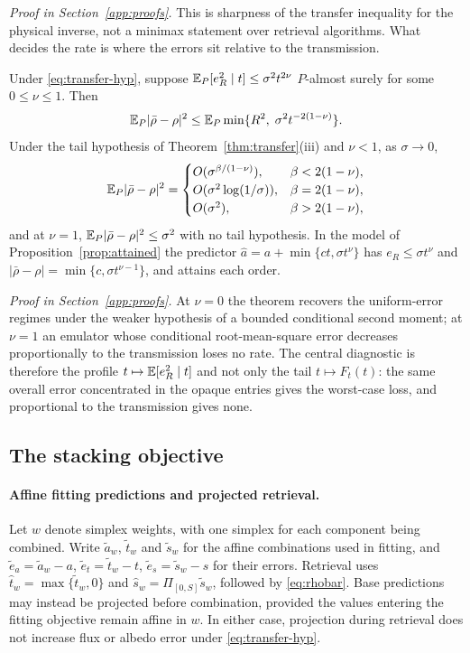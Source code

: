 \noindent\emph{Proof in Section~\ref{app:proofs}.}
This is sharpness of the transfer inequality for the physical inverse, not a minimax statement over retrieval
algorithms. What decides the rate is where the errors sit relative to the transmission.

\begin{theorem}\label{thm:profile}
Under \eqref{eq:transfer-hyp}, suppose $\mathbb{E}_P[e_R^2\mid t]\le\sigma^2t^{2\nu}$ $P$-almost surely for some $0\le\nu\le1$. Then
\[
\mathbb{E}_P|\bar\rho-\rho|^2\le\mathbb{E}_P\min\{R^2,\;\sigma^2t^{-2(1-\nu)}\} .
\]
Under the tail hypothesis of Theorem~\ref{thm:transfer}(iii) and $\nu<1$, as $\sigma\to0$,
\[
\mathbb{E}_P|\bar\rho-\rho|^2=
\begin{cases}
O(\sigma^{\beta/(1-\nu)}), & \beta<2(1-\nu),\\
O(\sigma^2\log(1/\sigma)), & \beta=2(1-\nu),\\
O(\sigma^2), & \beta>2(1-\nu),
\end{cases}
\]
and at $\nu=1$, $\mathbb{E}_P|\bar\rho-\rho|^2\le\sigma^2$ with no tail hypothesis. In the model of
Proposition~\ref{prop:attained} the predictor $\widehat a=a+\min\{ct,\sigma t^\nu\}$ has $e_R\le\sigma t^\nu$ and
$|\bar\rho-\rho|=\min\{c,\sigma t^{\nu-1}\}$, and attains each order.
\end{theorem}

\noindent\emph{Proof in Section~\ref{app:proofs}.}
At $\nu=0$ the theorem recovers the uniform-error regimes under the weaker hypothesis of a bounded conditional
second moment; at $\nu=1$ an emulator whose conditional root-mean-square error decreases proportionally to the
transmission loses no rate. The central diagnostic is therefore the profile $t\mapsto\mathbb{E}[e_R^2\mid t]$ and not only
the tail $t\mapsto F_t(t)$: the same overall error concentrated in the opaque entries gives the worst-case loss,
and proportional to the transmission gives none.

\subsection{The stacking objective}\label{sec:joint}

\paragraph{Affine fitting predictions and projected retrieval.}
Let $w$ denote simplex weights, with one simplex for each component being combined.
Write $\widetilde a_w$, $\widetilde t_w$ and $\widetilde s_w$ for the affine combinations
used in fitting, and $\widetilde e_a=\widetilde a_w-a$, $\widetilde e_t=\widetilde t_w-t$,
$\widetilde e_s=\widetilde s_w-s$ for their errors. Retrieval uses
$\widehat t_w=\max\{\widetilde t_w,0\}$ and
$\widehat s_w=\Pi_{[0,S]}\widetilde s_w$, followed by \eqref{eq:rhobar}.
Base predictions may instead be projected before combination, provided the values
entering the fitting objective remain affine in $w$. In either case, projection during
retrieval does not increase flux or albedo error under \eqref{eq:transfer-hyp}.

